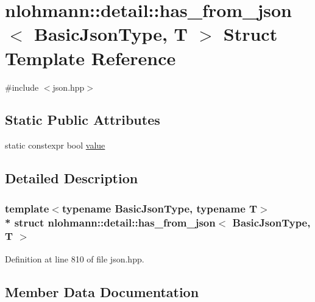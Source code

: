 \hypertarget{structnlohmann_1_1detail_1_1has__from__json}{}\section{nlohmann\+:\+:detail\+:\+:has\+\_\+from\+\_\+json$<$ Basic\+Json\+Type, T $>$ Struct Template Reference}
\label{structnlohmann_1_1detail_1_1has__from__json}


{\ttfamily \#include $<$json.\+hpp$>$}

\subsection*{Static Public Attributes}
\begin{DoxyCompactItemize}
\item 
static constexpr bool \hyperlink{structnlohmann_1_1detail_1_1has__from__json_a16701d806343c58ae7e884024dd14955}{value}
\end{DoxyCompactItemize}


\subsection{Detailed Description}
\subsubsection*{template$<$typename Basic\+Json\+Type, typename T$>$\\*
struct nlohmann\+::detail\+::has\+\_\+from\+\_\+json$<$ Basic\+Json\+Type, T $>$}



Definition at line 810 of file json.\+hpp.



\subsection{Member Data Documentation}
